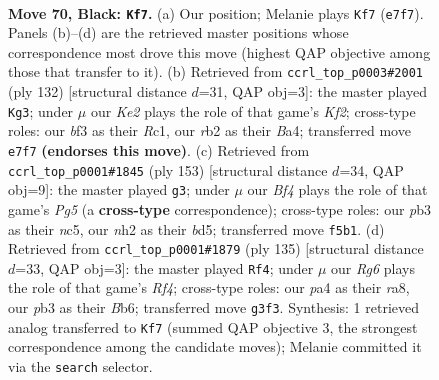 \documentclass[11pt]{article}
\begin{document}
\clearpage

\begin{figure}[p]\centering
\begin{subfigure}{0.46\textwidth}\centering
\resizebox{\linewidth}{!}{%
\newchessgame
\chessboard[
  setfen={8/B3k3/8/1K3b2/P7/1P3Brp/1R5N/8 b - - 19 70},
  showmover=false,
  pgfstyle=straightmove, color=movearrow, markmove={e7-f7}
]}
\caption{}
\end{subfigure}\hfill
\begin{subfigure}{0.46\textwidth}\centering
\resizebox{\linewidth}{!}{%
\newchessgame
\chessboard[
  setfen={3n3r/3P4/3k4/3p3p/B7/1P6/5K2/2R5 w - - 14 67},
  showmover=false,
  pgfstyle=straightmove, color=movearrow, markmove={f2-g3}
]}
\caption{}
\end{subfigure}
\\[4pt]
\begin{subfigure}{0.46\textwidth}\centering
\resizebox{\linewidth}{!}{%
\newchessgame
\chessboard[
  setfen={2R5/4k3/8/1pNBp3/4P1p1/4r2p/8/7K b - - 0 77},
  showmover=false,
  pgfstyle=straightmove, color=movearrow, markmove={g4-g3}
]}
\caption{}
\end{subfigure}\hfill
\begin{subfigure}{0.46\textwidth}\centering
\resizebox{\linewidth}{!}{%
\newchessgame
\chessboard[
  setfen={R7/4k3/1b6/4pr2/P7/5P2/4B3/4K3 b - - 1 68},
  showmover=false,
  pgfstyle=straightmove, color=movearrow, markmove={f5-f4}
]}
\caption{}
\end{subfigure}
\caption{\textbf{Move 70, Black: \texttt{Kf7}.} (a) Our position; Melanie plays \texttt{Kf7} (\texttt{e7f7}). Panels (b)--(d) are the retrieved master positions whose correspondence most drove this move (highest QAP objective among those that transfer to it). (b) Retrieved from \texttt{ccrl\_top\_p0003\#2001} (ply 132) [structural distance $d$=31, QAP obj=3]: the master played \texttt{Kg3}; under $\mu$ our \emph{Ke2} plays the role of that game's \emph{Kf2}; cross-type roles: our \emph{b}f3 as their \emph{R}c1, our \emph{r}b2 as their \emph{B}a4; transferred move \texttt{e7f7} \textbf{(endorses this move)}. (c) Retrieved from \texttt{ccrl\_top\_p0001\#1845} (ply 153) [structural distance $d$=34, QAP obj=9]: the master played \texttt{g3}; under $\mu$ our \emph{Bf4} plays the role of that game's \emph{Pg5} (a \textbf{cross-type} correspondence); cross-type roles: our \emph{p}b3 as their \emph{n}c5, our \emph{n}h2 as their \emph{b}d5; transferred move \texttt{f5b1}. (d) Retrieved from \texttt{ccrl\_top\_p0001\#1879} (ply 135) [structural distance $d$=33, QAP obj=3]: the master played \texttt{Rf4}; under $\mu$ our \emph{Rg6} plays the role of that game's \emph{Rf4}; cross-type roles: our \emph{p}a4 as their \emph{r}a8, our \emph{p}b3 as their \emph{B}b6; transferred move \texttt{g3f3}. Synthesis: 1 retrieved analog transferred to \texttt{Kf7} (summed QAP objective 3, the strongest correspondence among the candidate moves); Melanie committed it via the \texttt{search} selector.}
\label{fig:thought-m139}
\end{figure}
\end{document}
